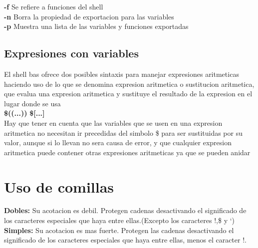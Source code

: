 \documentclass[11pt]{article}
\begin{document}
\hspace{2cm} \textbf{-f}\hspace{2cm} Se refiere a funciones del shell\\

\hspace{2cm}\textbf{-n}\hspace{2cm} Borra la propiedad de exportacion para las variables \\

\hspace{2cm}\textbf{-p} \hspace{2cm} Muestra una lista de las variables y funciones exportadas \\

\subsection{Expresiones con variables }

El shell bas ofrece dos posibles sintaxis para manejar expresiones aritmeticas haciendo uso de lo que se denomina expresion aritmetica o sustitucion aritmetica, que evalua una expresion aritmetica y sustituye el resultado de la expresion en el lugar donde se usa \\

\hspace{2cm} \textbf{\$((...))} \hspace{3cm} \textbf{\$[...]}\\

Hay que tener en cuenta que las variables que se usen en una expresion aritmetica no necesitan ir precedidas del simbolo \$ para ser sustituidas por su valor, aunque si lo llevan no sera causa de error, y que cualquier expresion aritmetica puede contener otras expresiones aritmeticas ya que se pueden anidar \\

\section{Uso de comillas}

\textbf{Dobles:} Su acotacion es debil. Protegen cadenas desactivando el significado de los caracteres especiales que haya entre ellas.(Excepto los caracteres !,\$ y `)\\

\textbf{Simples:} Su acotacion es mas fuerte. Protegen las cadenas desactivando el significado de los caracteres especiales que haya entre ellas, menos el caracter !.\\
\end{document}
